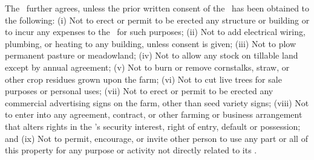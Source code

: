 The \lessee\ further agrees, unless the prior written consent of the \lessor\ has been obtained to the following: (i) Not to erect or permit to be erected any structure or building or to incur any expenses to the \lessor\ for such purposes; (ii) Not to add electrical wiring, plumbing, or heating to any building, unless consent is given; (iii) Not to plow permanent pasture or meadowland; (iv) Not to allow any stock on tillable land except by annual agreement; (v) Not to burn or remove cornstalks, straw, or other crop residues grown upon the farm; (vi) Not to cut live trees for sale purposes or personal uses; (vii) Not to erect or permit to be erected any commercial advertising signs on the farm, other than seed variety signs; (viii) Not to enter into any agreement, contract, or other farming or business arrangement that alters rights in the \lessor’s security interest, right of entry, default or possession; and (ix) Not to permit, encourage, or invite other person to use any part or all of this property for any purpose or activity not directly related to its \permitteduse.
